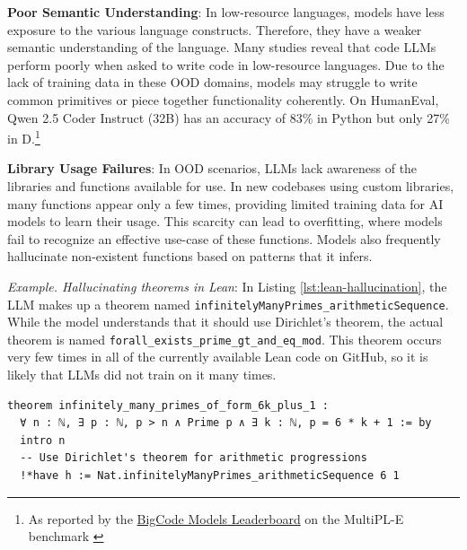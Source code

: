 \textbf{Poor Semantic Understanding}: In low-resource languages, models have less exposure to the various language constructs. Therefore, they have a weaker semantic understanding of the language. Many studies reveal that code LLMs perform poorly when asked to write code in low-resource languages. Due to the lack of training data in these OOD domains, models may struggle to write common primitives or piece together functionality coherently. On HumanEval, Qwen 2.5 Coder Instruct (32B) \citep{hui2024qwen2} has an accuracy of 83\% in Python but only 27\% in D.\footnote{As reported by the \href{https://huggingface.co/spaces/bigcode/bigcode-models-leaderboard}{BigCode Models Leaderboard} on the MultiPL-E benchmark \citep{cassano2023multipl}}



\textbf{Library Usage Failures}: In OOD scenarios, LLMs lack awareness of the libraries and functions available for use. In new codebases using custom libraries, many functions appear only a few times, providing limited training data for AI models to learn their usage. This scarcity can lead to overfitting, where models fail to recognize an effective use-case of these functions. Models also frequently hallucinate non-existent functions based on patterns that it infers.

\begin{tcolorbox}[colback=lightblue, boxrule=0pt, arc=5pt, outer arc=5pt, after skip=10pt plus 2pt]
\textit{Example. Hallucinating theorems in Lean}: In Listing \ref{lst:lean-hallucination}, the LLM makes up a theorem named \texttt{infinitelyManyPrimes\_arithmeticSequence}. While the model understands that it should use Dirichlet's theorem, the actual theorem is named \texttt{forall\_exists\_prime\_gt\_and\_eq\_mod}. This theorem occurs very few times in all of the currently available Lean code on GitHub, so it is likely that LLMs did not train on it many times.

\begin{lstlisting}[caption={LLM-generated Lean code snippet that hallucinates a nonexistent function},label={lst:lean-hallucination}, captionpos=t, language=lean, breaklines=true, style=mystyle]
theorem infinitely_many_primes_of_form_6k_plus_1 :
  ∀ n : ℕ, ∃ p : ℕ, p > n ∧ Prime p ∧ ∃ k : ℕ, p = 6 * k + 1 := by
  intro n
  -- Use Dirichlet's theorem for arithmetic progressions
  !*have h := Nat.infinitelyManyPrimes_arithmeticSequence 6 1
\end{lstlisting}
\end{tcolorbox}


